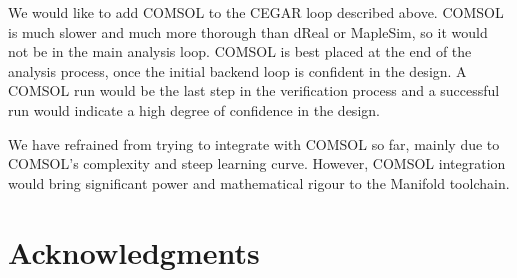 
We would like to add COMSOL to the CEGAR loop described above.
COMSOL is much slower and much more thorough than dReal or MapleSim, so it would not be in the main analysis loop.
COMSOL is best placed at the end of the analysis process, once the initial backend loop is confident in the design.
A COMSOL run would be the last step in the verification process and a successful run would indicate a high degree of confidence in the design.

We have refrained from trying to integrate with COMSOL so far, mainly due to COMSOL's complexity and steep learning curve.
However, COMSOL integration would bring significant power and mathematical rigour to the Manifold toolchain.

\section{Acknowledgments}


